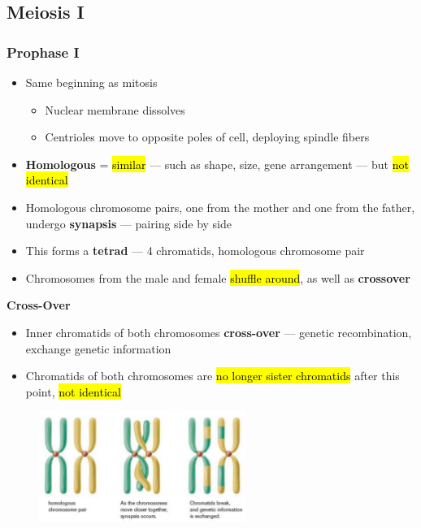 \documentclass[a4paper,12pt]{article}
\begin{document}
\subsection{Meiosis I}

\subsubsection{Prophase I}
\begin{itemize}
    \item{Same beginning as mitosis
          \begin{itemize}
              \item{Nuclear membrane dissolves}
              \item{Centrioles move to opposite poles of cell, deploying spindle fibers}
          \end{itemize}
         }
     \item{\textbf{Homologous} = \hl{similar} --- such as shape, size, gene arrangement --- but \hl{not identical}}
     \item{Homologous chromosome pairs, one from the mother and one from the father, undergo \textbf{synapsis} --- pairing side by side}
     \item{This forms a \textbf{tetrad} --- 4 chromatids, homologous chromosome pair}
     \item{Chromosomes from the male and female \hl{shuffle around}, as well as \textbf{crossover}}
\end{itemize}
\textbf{Cross-Over}
\begin{itemize}
     \item{Inner chromatids of both chromosomes \textbf{cross-over} --- genetic recombination, exchange genetic information}
     \item{Chromatids of both chromosomes are \hl{no longer sister chromatids} after this point, \hl{not identical}}
\end{itemize}

\begin{figure}[H]
    \centering
    \includegraphics[width=0.6\textwidth]{synapsis}
\end{figure}
\end{document}
